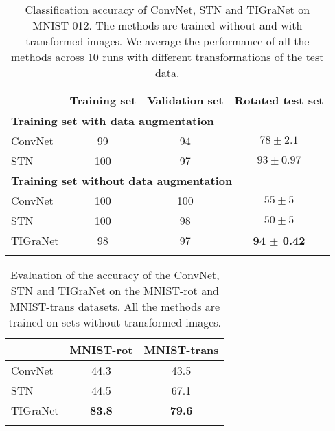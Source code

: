 \documentclass[10pt,journal,compsoc]{IEEEtran}
\begin{document}
	\begin{table}[t!]
		\centering
		\begin{tabularx}{\linewidth}{ X c c c }
			\toprule
			& \scriptsize{Training set} & \scriptsize{Validation set}  & \scriptsize{Rotated test set} \\
			\midrule
			\multicolumn{4}{l}{\scriptsize{\bf{Training set with data augmentation}}}\\
			\qquad ConvNet &  99  &  94 &  $ 78 \pm 2.1$   \\
			\qquad STN & 100  &  97 & $ 93 \pm 0.97$   \\
			\midrule
			\multicolumn{4}{l}{\scriptsize{\bf{Training set without data augmentation}}}\\
			\qquad ConvNet & 100  &  100 &  $ 55 \pm 5$   \\
			\qquad STN & 100  &  98 & $ 50 \pm 5$   \\
			\qquad  TIGraNet & 98  &  97 & \bf{ 94 $\pm$ 0.42 }   \\
			\bottomrule
			\\
		\end{tabularx}
		\caption{Classification accuracy of ConvNet, STN and TIGraNet on MNIST-012. The methods are trained without and with transformed images. We average the performance of all the methods across 10 runs with different transformations of the test data.}
		\label{tab:comparison}
	\end{table}
	\begin{table}[t!]
		\centering
		\begin{tabularx}{\linewidth}{ X c c }
			\toprule
			& \scriptsize{MNIST-rot} & \scriptsize{MNIST-trans} \\
			\midrule
			\qquad ConvNet & 44.3 & 43.5  \\
			\qquad STN &  44.5 & 67.1 \\
			\qquad TIGraNet &  \bf{83.8} & \bf{79.6} \\
			\bottomrule
			\\
		\end{tabularx}
		\caption{Evaluation of the accuracy of the ConvNet, STN and TIGraNet on the MNIST-rot and MNIST-trans datasets. All the methods are trained on sets without transformed images.} 
		\label{tab:all_digit}
	\end{table}
	
\end{document}
